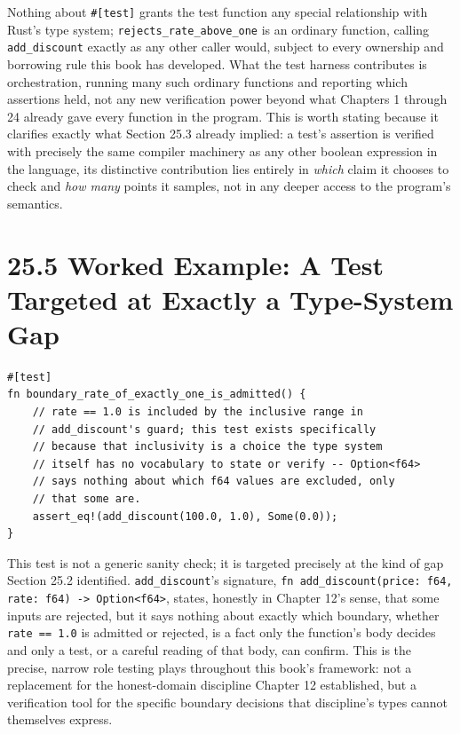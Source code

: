 \documentclass[11pt]{book}
\begin{document}
Nothing about \texttt{\#[test]} grants the test function any special relationship with Rust's type system; \texttt{rejects\_rate\_above\_one} is an ordinary function, calling \texttt{add\_discount} exactly as any other caller would, subject to every ownership and borrowing rule this book has developed. What the test harness contributes is orchestration, running many such ordinary functions and reporting which assertions held, not any new verification power beyond what Chapters 1 through 24 already gave every function in the program. This is worth stating because it clarifies exactly what Section 25.3 already implied: a test's assertion is verified with precisely the same compiler machinery as any other boolean expression in the language, its distinctive contribution lies entirely in \emph{which} claim it chooses to check and \emph{how many} points it samples, not in any deeper access to the program's semantics.

\section*{25.5 Worked Example: A Test Targeted at Exactly a Type-System Gap}

\begin{lstlisting}
#[test]
fn boundary_rate_of_exactly_one_is_admitted() {
    // rate == 1.0 is included by the inclusive range in
    // add_discount's guard; this test exists specifically
    // because that inclusivity is a choice the type system
    // itself has no vocabulary to state or verify -- Option<f64>
    // says nothing about which f64 values are excluded, only
    // that some are.
    assert_eq!(add_discount(100.0, 1.0), Some(0.0));
}
\end{lstlisting}

This test is not a generic sanity check; it is targeted precisely at the kind of gap Section 25.2 identified. \texttt{add\_discount}'s signature, \texttt{fn add\_discount(price: f64, rate: f64) -> Option<f64>}, states, honestly in Chapter 12's sense, that some inputs are rejected, but it says nothing about exactly which boundary, whether \texttt{rate == 1.0} is admitted or rejected, is a fact only the function's body decides and only a test, or a careful reading of that body, can confirm. This is the precise, narrow role testing plays throughout this book's framework: not a replacement for the honest-domain discipline Chapter 12 established, but a verification tool for the specific boundary decisions that discipline's types cannot themselves express.
\end{document}
